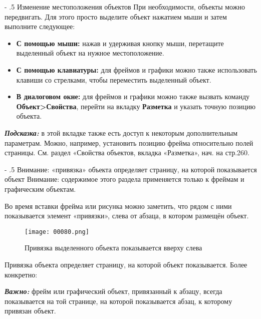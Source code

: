 \documentclass[a4paper,10pt]{article}
\makeatletter
\renewcommand\paragraph{%
   \@startsection{paragraph}{4}{0mm}%
      {-\baselineskip}%
      {.5\baselineskip}%
      {\normalfont\normalsize\bfseries}}
\makeatother
\begin{document}
\paragraph{Изменение местоположения объектов}
При необходимости, объекты можно передвигать. Для этого просто выделите объект нажатием мыши и затем выполните следующее:
\begin{itemize}
 \item \textbf{С помощью мыши:} нажав и удерживая кнопку мыши, перетащите выделенный объект на нужное местоположение.
 \item \textbf{С помощью клавиатуры:} для фреймов и графики можно также использовать клавиши со стрелками, чтобы переместить выделенный объект.
 \item \textbf{В диалоговом окне:} для фреймов и графики можно также вызвать команду \textbf{Объект>Свойства}, перейти на вкладку \textbf{Разметка} и указать точную позицию объекта.
\end{itemize}

\textbf{\textit{Подсказка:}} в этой вкладке также есть доступ к некоторым дополнительным параметрам. Можно, например, установить позицию фрейма относительно полей страницы. См. раздел «Свойства объектов, вкладка «Разметка», нач. на стр.260.

\paragraph{Внимание: «привязка» объекта определяет страницу, на которой показывается объект}
Внимание: содержимое этого раздела применяется только к фреймам и графическим объектам.

Во время вставки фрейма или рисунка можно заметить, что рядом с ними показывается элемент «привязки», слева от абзаца, в котором размещён объект.

\begin{figure}[ht]
\texttt{[image: 00080.png]}
\centering
\caption{Привязка выделенного объекта показывается вверху слева}
\end{figure}

Привязка объекта определяет страницу, на которой объект показывается. Более конкретно:

\begin{mdframed}[backgroundcolor=blue!10]
\textbf{\textit{Важно:}} фрейм или графический объект, привязанный к абзацу, всегда показывается на той странице, на которой показывается абзац, к которому привязан объект.
\end{mdframed}
\end{document}
